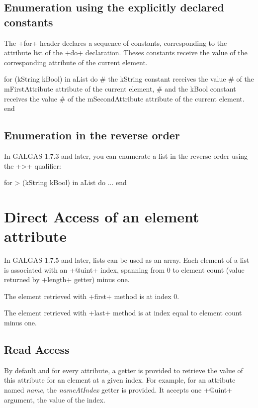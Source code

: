 \subsection{Enumeration using the explicitly declared constants}

The \ggsq+for+ header declares a sequence of constants, corresponding to the attribute list of the \ggsq+do+ declaration. Theses constants receive the value of the corresponding attribute of the current element.


\begin{galgas4}
for (kString kBool) in aList do
  # the kString constant receives the value
  # of the mFirstAttribute attribute of the current element,
  # and the kBool constant receives the value
  # of the mSecondAttribute attribute of the current element.
end
\end{galgas4}

\subsection{Enumeration in the reverse order}

In GALGAS 1.7.3 and later, you can enumerate a list in the reverse order using the \ggsq+>+ qualifier:

\begin{galgas4}
for > (kString kBool) in aList do
  ...
end
\end{galgas4}




\section{Direct Access of an element attribute}

In GALGAS 1.7.5 and later, lists can be used as an array. Each element of a list is associated with an \ggsq+@uint+ index, spanning from 0 to element count (value returned by \ggsq+length+ getter) minus one.

The element retrieved with \ggsq+first+ method is at index 0.

The element retrieved with \ggsq+last+ method is at index equal to element count minus one.

\subsection{Read Access}

By default and for every attribute, a getter is provided to retrieve the value of this attribute for an element at a given index. For example, for an attribute named \emph{name}, the \emph{nameAtIndex} getter is provided. It accepts one \ggsq+@uint+ argument, the value of the index.

